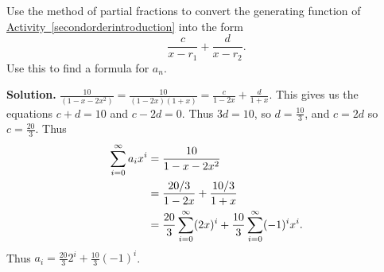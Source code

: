 \documentclass{book}
\begin{document}
\setcounter{project}{266}
\addtocounter{project}{-1}
\begin{activity}[]\label{activity-259}
\hypertarget{p-1429}{}%
Use the method of partial fractions to convert the generating function of \hyperref[secondorderintroduction]{Activity~\ref{secondorderintroduction}} into the form%
\begin{equation*}
\frac{c}{x-r_1} + \frac{d}{x-r_2}\text{.}
\end{equation*}
Use this to find a formula for \(a_n\).%
\par\smallskip%
\noindent\textbf{Solution.}\hypertarget{solution-203}{}\quad%
\hypertarget{p-1430}{}%
\(\frac{10}{(1-x-2x^2)}=\frac{10}{(1-2x)(1+x)} = \frac{c}{1-2x} +\frac{d}{1+x}\). This gives us the equations \(c+d=10\) and \(c-2d=0\). Thus \(3d=10\), so \(d=\frac{10}{3}\), and \(c=2d\) so \(c=\frac{20}{3}\). Thus%
\begin{align*}
\sum_{i=0}^\infty a_ix^i  &=  \frac{10}{1-x-2x^2}\\
&= \frac{20/3}{1-2x} + \frac{10/3}{1+x}\\
&= \frac{20}{3}\sum_{i=0}^\infty (2x)^i + \frac{10}{3}\sum_{i=0}^\infty (-1)^ix^i\text{.}
\end{align*}
Thus \(a_i=\frac{20}{3}2^i +\frac{10}{3}(-1)^i\).%
\end{activity}
\end{document}
